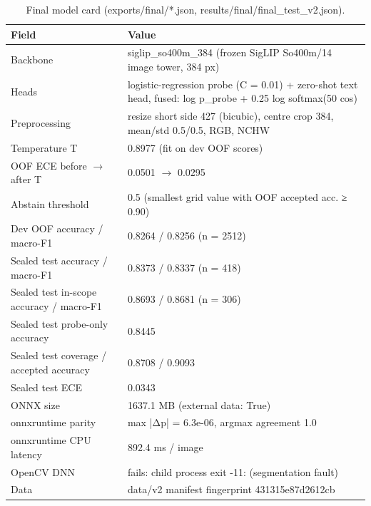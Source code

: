 \begin{table}[t]
\centering\small
\caption{Final model card (exports/final/*.json, results/final/final\_test\_v2.json).}
\label{tab:model_card}
\begin{tabular}{lp{10cm}}
\toprule
Field & Value \\
\midrule
Backbone & siglip\_so400m\_384 (frozen SigLIP So400m/14 image tower, 384 px) \\
Heads & logistic-regression probe (C = 0.01) + zero-shot text head, fused: log p\_probe + 0.25 log softmax(50 cos) \\
Preprocessing & resize short side 427 (bicubic), centre crop 384, mean/std 0.5/0.5, RGB, NCHW \\
Temperature T & 0.8977 (fit on dev OOF scores) \\
OOF ECE before $\rightarrow$ after T & 0.0501 $\rightarrow$ 0.0295 \\
Abstain threshold & 0.5 (smallest grid value with OOF accepted acc. ≥ 0.90) \\
Dev OOF accuracy / macro-F1 & 0.8264 / 0.8256 (n = 2512) \\
Sealed test accuracy / macro-F1 & 0.8373 / 0.8337 (n = 418) \\
Sealed test in-scope accuracy / macro-F1 & 0.8693 / 0.8681 (n = 306) \\
Sealed test probe-only accuracy & 0.8445 \\
Sealed test coverage / accepted accuracy & 0.8708 / 0.9093 \\
Sealed test ECE & 0.0343 \\
ONNX size & 1637.1 MB (external data: True) \\
onnxruntime parity & max |Δp| = 6.3e-06, argmax agreement 1.0 \\
onnxruntime CPU latency & 892.4 ms / image \\
OpenCV DNN & fails: child process exit -11: (segmentation fault) \\
Data & data/v2 manifest fingerprint 431315e87d2612cb \\
\bottomrule
\end{tabular}
\end{table}
